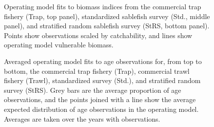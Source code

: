 \documentclass[11pt]{book}
\begin{document}
\begin{figure}[htb]

{\centering {} 

}

\caption{Operating model fits to biomass indices from the commercial trap fishery (Trap, top panel), standardized sablefish survey (Std., middle panel), and stratified random sablefish survey (StRS, bottom panel). Points show observations scaled by catchability, and lines show operating model vulnerable biomass.}\label{fig:unnamed-chunk-14}
\end{figure}
\newpage
\begin{figure}[htb]

{\centering {} 

}

\caption{Averaged operating model fits to age observations for, from top to bottom, the commercial trap fishery (Trap), commercial trawl fishery (Trawl), standardized survey (Std.), and stratified random survey (StRS). Grey bars are the average proportion of age observations, and the points joined with a line show the average expected distribution of age observations in the operating model. Averages are taken over the years with observations.}\label{fig:unnamed-chunk-15}
\end{figure}
\newpage
\end{document}
